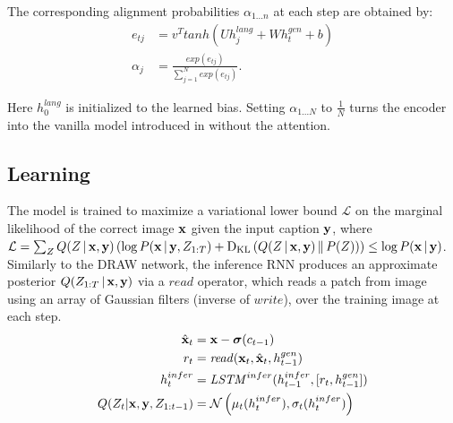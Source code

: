 \documentclass{article} %
\newcommand{\given}{\,|\,}
\newcommand{\kldiv}{\mathrm{D}_{\rm KL}}
\newcommand{\klBars}{\,\|\,}
\newcommand{\sigmoid}{\boldsymbol{\sigma}}
\newcommand{\hlang}{h^{lang}}
\newcommand{\hdec}{h^{gen}}
\newcommand{\henc}{h^{infer}}
\newcommand{\readop}{\mathit{read}}
\newcommand{\writeop}{\mathit{write}}
\newcommand{\encoder}{\mathit{LSTM}^{infer}}
\newcommand{\canv}{c}
\newcommand{\Lat}{Z}
\newcommand{\icaption}{{\bf{y}}}
\newcommand{\oimage}{{\bf{x}}}
\newcommand{\post}{Q}
\newcommand{\loss}{\mathcal{L}}
\newcommand{\lloss}{\mathcal{L}^{z}}
\newcommand{\rloss}{\mathcal{L}^{x}}
\begin{document}
{The corresponding alignment probabilities $\alpha_{1...n}$ at each step are obtained by:
\begin{align}
e_{tj} &= v^{T}tanh(U\hlang_{j} + W\hdec_{t} + b)\\
\alpha_{j} &= \frac{exp(e_{tj})}{\sum_{j=1}^{N}exp(e_{tj})}.
\end{align}

Here $\hlang_{0}$ is initialized to the learned bias.
Setting $\alpha_{1...N}$ to $\frac{1}{N}$ turns the encoder into the vanilla model introduced in \citep{cho_mt} without the attention. 
}


\subsection{Learning}

The model is trained to maximize a variational lower bound $\loss$ on the marginal likelihood of the correct image $\oimage$ given the input caption $\icaption$, where $\loss = \sum_{\Lat}Q(\Lat\given\oimage,\icaption)\left(\log P(\oimage\given\icaption, \Lat_{1:T}) + \kldiv\left(Q(\Lat\given\oimage,\icaption)\klBars P(\Lat)\right)\right) \le \log P(\oimage\given\icaption)$. %
Similarly to the DRAW network, the inference RNN produces an approximate posterior $Q(\Lat_{1:T}\given\oimage,\icaption)$ via a $\readop$ operator, which reads a patch from image using an array of Gaussian filters (inverse of $\writeop$), over the training image at each step. 
\begin{align}
\label{eq:x_hat}
\hat{\oimage}_t &= \oimage-\sigmoid(\canv_{t-1})\\
\label{eq:read}
r_t &= \readop(\oimage_t, \hat{\oimage}_t, \hdec_{t-1})\\
\henc_t &= \encoder(\henc_{t-1}, [r_t, \hdec_{t-1}])\\
\post(\Lat_t|\oimage,\icaption,\Lat_{1:t-1}) &= \mathcal{N}\left(\mu_t(\henc_t), \sigma_t(\henc_t)\right)
\end{align}


\end{document}
